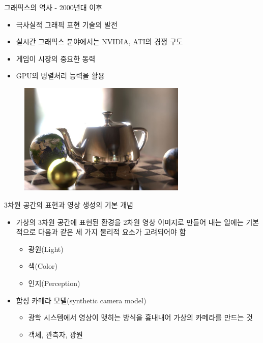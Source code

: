\documentclass{beamer}
\begin{document}
\begin{frame}{그래픽스의 역사 - 2000년대 이후}

\begin{itemize}
\item 극사실적 그래픽 표현 기술의 발전
\item 실시간 그래픽스 분야에서는 NVIDIA, ATI의 경쟁 구도
\item 게임이 시장의 중요한 동력
\item GPU의 병렬처리 능력을 활용
\end{itemize}

\begin{figure}
    \includegraphics[width=8cm]{OGL_intro/photorealisticTeapot.jpg}
\end{figure}


\end{frame}


\begin{frame}{3차원 공간의 표현과 영상 생성의 기본 개념}

\begin{itemize}
\item 가상의 3차원 공간에 표현된 환경을 2차원 영상 이미지로 만들어 내는 일에는 기본적으로 다음과 같은 세 가지 물리적 요소가 고려되어야 함
	\begin{itemize}
	\item 광원(Light)
	\item 색(Color)
	\item 인지(Perception)
	\end{itemize}
\end{itemize}

\begin{itemize}
\item 합성 카메라 모델(synthetic camera model)
	\begin{itemize}
	\item 광학 시스템에서 영상이 맺히는 방식을 흉내내어 가상의 카메라를 만드는 것
	\item 객체, 관측자, 광원
	\end{itemize}
\end{itemize}	

\end{frame}
\end{document}
